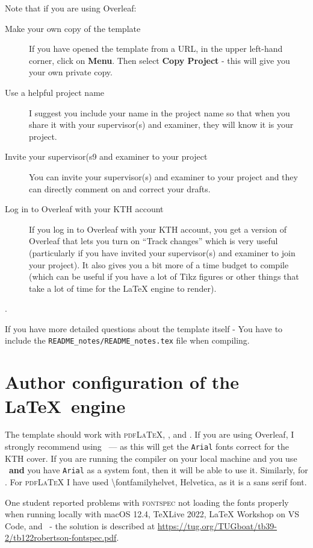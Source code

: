 \documentclass[main.tex]{subfiles}
\begin{document}
Note that if you are using Overleaf:
\begin{description}
    \item[Make your own copy of the template]
    If you have opened the template from a URL, in the upper left-hand corner, click on \textbf{Menu}. Then select \textbf{Copy Project} - this will give you your own private copy.

\item[Use a helpful project name]
    I suggest you include your name in the project name so that when you share it with your supervisor(s) and examiner, they will know it is your project.
\item[Invite your supervisor(s9 and examiner to your project]
    You can invite your supervisor(s) and examiner to your project and they can directly comment on and correct your drafts.
\item[Log in to Overleaf with your KTH account]
If you log in to Overleaf with your KTH account, you get a version of Overleaf that lets you turn on ``Track changes'' which is very useful (particularly if you have invited your supervisor(s) and examiner to join your project). It also gives you a bit more of a time budget to compile (which can be useful if you have a lot of Tikz figures or other things that take a lot of time for the LaTeX engine to render).
\end{description}

.


If you have more detailed questions about the template itself -
{You have to include the \texttt{README\_notes/README\_notes.tex} file when compiling.}

\section{Author configuration of the \LaTeX\  engine}
\label{sec:latexEngine}
The template should work with \textsc{pdfLaTeX}, \XeLaTeX, and \LuaLaTeX.  If you are using Overleaf, I strongly recommend using \XeLaTeX\ ---  as this will get the \texttt{Arial} fonts correct for the KTH cover. If you are running the compiler on your local machine and you use \XeLaTeX\  \textbf{and} you have \texttt{Arial} as a system font, then it will be able to use it. Similarly, for \LuaLaTeX. For \textsc{pdfLaTeX} I have used \textbackslash fontfamily{helvet}, \ie Helvetica, as it is a sans serif font.

One student reported problems with \textsc{fontspec} not loading the fonts properly when running locally with macOS 12.4, TeXLive 2022, LaTeX Workshop on VS Code, and \XeLaTeX\  - the solution is described at \url{https://tug.org/TUGboat/tb39-2/tb122robertson-fontspec.pdf}.
\end{document}

